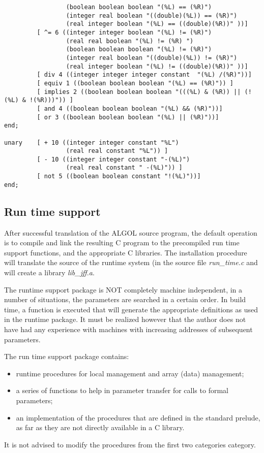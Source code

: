 \documentclass[11pt]{article}
\begin{document}
{\begin{verbatim}
                 (boolean boolean boolean "(%L) == (%R)")
                 (integer real boolean "((double)(%L)) == (%R)")
                 (real integer boolean "(%L) == ((double)(%R))" ))]
         [ ^= 6 ((integer integer boolean "(%L) != (%R)")
                 (real real boolean "(%L) != (%R) ")
                 (boolean boolean boolean "(%L) != (%R)")
                 (integer real boolean "((double)(%L)) != (%R)")
                 (real integer boolean "(%L) != ((double)(%R))" ))]
         [ div 4 ((integer integer integer constant  "(%L) /(%R)"))]
         [ equiv 1 ((boolean boolean boolean "(%L) == (%R)")) ]
         [ implies 2 ((boolean boolean boolean "(((%L) & (%R)) || (!(%L) & !(%R)))")) ]
         [ and 4 ((boolean boolean boolean "(%L) && (%R)"))]
         [ or 3 ((boolean boolean boolean "(%L) || (%R)"))]
end;

unary    [ + 10 ((integer integer constant "%L")
                 (real real constant "%L")) ]
         [ - 10 ((integer integer constant "-(%L)")
                 (real real constant " -(%L)")) ]
         [ not 5 ((boolean boolean constant "!(%L)"))]
end;
\end{verbatim}
}

\subsection{Run time support}

After successful translation of the ALGOL source program,
the default operation is to
compile and link the resulting C program to the precompiled run time support
functions, and the appropriate C libraries.
The installation procedure will translate the source of the
runtime system (in the source file {\em run\_time.c} and will
create a library {\em lib\_jff.a}.

The runtime support package is NOT completely machine
independent,  in a number of situations, the parameters are searched in a certain order.
In build time, a function is executed that will
generate the appropriate definitions as used in the runtime package.
It must be realized however that the author does not have had any
experience with machines with increasing addresses of subsequent parameters.

The run time support package contains:
\begin{itemize}
\item runtime procedures for local management and array (data) management;
\item a series of functions to help in parameter transfer for calls to
formal parameters;
\item an implementation of the procedures that are
defined in the standard prelude, as far as they are not directly available
in a C library.
\end{itemize}
It is not advised to modify the procedures from the first two categories category.
\end{document}
